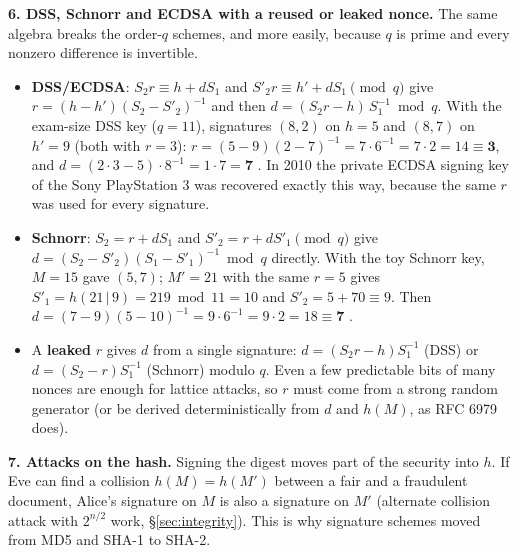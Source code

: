 \textbf{6. DSS, Schnorr and ECDSA with a reused or leaked nonce.} The same algebra breaks the order-$q$ schemes, and more easily, because $q$ is prime and every nonzero difference is invertible.
\begin{itemize}[leftmargin=1.4em]
  \item \textbf{DSS/ECDSA}: $S_2 r \equiv h + d S_1$ and $S'_2 r \equiv h' + d S_1 \pmod q$ give $r = (h - h')(S_2 - S'_2)^{-1}$ and then $d = (S_2 r - h)\,S_1^{-1} \bmod q$. With the exam-size DSS key ($q = 11$), signatures $(8, 2)$ on $h = 5$ and $(8, 7)$ on $h' = 9$ (both with $r = 3$): $r = (5 - 9)(2 - 7)^{-1} = 7 \cdot 6^{-1} = 7 \cdot 2 = 14 \equiv \mathbf{3}$, and $d = (2 \cdot 3 - 5) \cdot 8^{-1} = 1 \cdot 7 = \mathbf{7}$ \checkmark. In 2010 the private ECDSA signing key of the Sony PlayStation 3 was recovered exactly this way, because the same $r$ was used for every signature.
  \item \textbf{Schnorr}: $S_2 = r + d S_1$ and $S'_2 = r + d S'_1 \pmod q$ give $d = (S_2 - S'_2)(S_1 - S'_1)^{-1} \bmod q$ directly. With the toy Schnorr key, $M = 15$ gave $(5, 7)$; $M' = 21$ with the same $r = 5$ gives $S'_1 = h(21 \,|\, 9) = 219 \bmod 11 = 10$ and $S'_2 = 5 + 70 \equiv 9$. Then $d = (7 - 9)(5 - 10)^{-1} = 9 \cdot 6^{-1} = 9 \cdot 2 = 18 \equiv \mathbf{7}$ \checkmark.
  \item A \textbf{leaked} $r$ gives $d$ from a single signature: $d = (S_2 r - h)S_1^{-1}$ (DSS) or $d = (S_2 - r)S_1^{-1}$ (Schnorr) modulo $q$. Even a few predictable bits of many nonces are enough for lattice attacks, so $r$ must come from a strong random generator (or be derived deterministically from $d$ and $h(M)$, as RFC 6979 does).
\end{itemize}

\textbf{7. Attacks on the hash.} Signing the digest moves part of the security into $h$. If Eve can find a collision $h(M) = h(M')$ between a fair and a fraudulent document, Alice's signature on $M$ is also a signature on $M'$ (alternate collision attack with $2^{n/2}$ work, \S\ref{sec:integrity}). This is why signature schemes moved from MD5 and SHA-1 to SHA-2.

